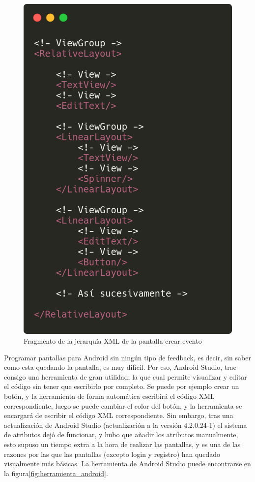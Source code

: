 \begin{figure}[h!]
  \centering
  \includegraphics[width=0.5\linewidth]{figs/Desarrollo/Codigo/xml_jerarquia}
  \caption[XML Jerarquia]{Fragmento de la jerarquía XML de la pantalla crear evento}
  \label{fig:xml_crear_evento}
\end{figure}

Programar pantallas para Android sin ningún tipo de feedback, es decir, sin saber como esta quedando la pantalla, es muy difícil. Por eso, Android Studio, trae consigo una herramienta de gran utilidad, la que cual permite visualizar y editar el código sin tener que escribirlo por completo. Se puede por ejemplo crear un botón, y la herramienta de forma automática escribirá el código XML correspondiente, luego se puede cambiar el color del botón, y la herramienta se encargará de escribir el código XML correspondiente. Sin embargo, tras una actualización de Android Studio (actualización a la versión 4.2.0.24-1) el sistema de atributos dejó de funcionar, y hubo que añadir los atributos manualmente, esto supuso un tiempo extra a la hora de realizar las pantallas, y es una de las razones por las que las pantallas (excepto login y registro) han quedado visualmente más básicas. La herramienta de Android Studio puede encontrarse en la figura\ref{fig:herramienta_android}.

